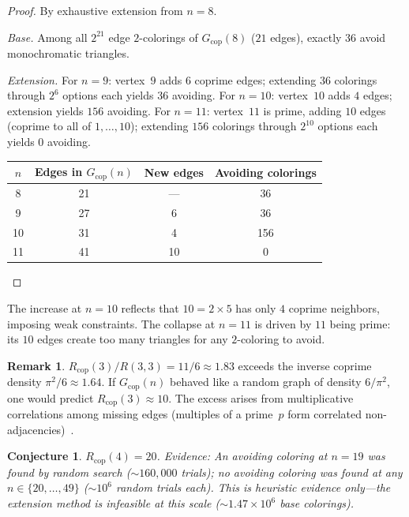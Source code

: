 \documentclass[11pt]{article}
\theoremstyle{plain}
\newtheorem{conjecture}[theorem]{Conjecture}
\theoremstyle{definition}
\newtheorem{remark}[theorem]{Remark}
\newcommand{\Rcop}{R_{\mathrm{cop}}}
\newcommand{\Gcop}{G_{\mathrm{cop}}}
\begin{document}
\begin{proof}
By exhaustive extension from $n=8$.

\emph{Base.} Among all $2^{21}$ edge $2$-colorings of $\Gcop(8)$
($21$ edges), exactly $36$ avoid monochromatic triangles.

\emph{Extension.} For $n=9$: vertex~$9$ adds $6$ coprime edges;
extending $36$ colorings through $2^6$ options each yields $36$
avoiding. For $n=10$: vertex~$10$ adds $4$ edges; extension yields
$156$ avoiding. For $n=11$: vertex~$11$ is prime, adding $10$ edges
(coprime to all of $1,\ldots,10$); extending $156$ colorings through
$2^{10}$ options each yields $0$ avoiding.

\begin{center}
\begin{tabular}{@{}cccc@{}}
\toprule
$n$ & Edges in $\Gcop(n)$ & New edges & Avoiding colorings \\
\midrule
8  & 21 & ---  & 36  \\
9  & 27 & 6  & 36  \\
10 & 31 & 4  & 156 \\
11 & 41 & 10 & 0   \\
\bottomrule
\end{tabular}
\end{center}
\end{proof}

The increase at $n=10$ reflects that $10=2\times 5$ has only $4$
coprime neighbors, imposing weak constraints. The collapse at $n=11$
is driven by $11$ being prime: its $10$ edges create too many
triangles for any $2$-coloring to avoid.

\begin{remark}\label{rem:rcop-ratio}
$\Rcop(3)/R(3,3)=11/6\approx 1.83$ exceeds the inverse coprime
density $\pi^2/6\approx 1.64$. If $\Gcop(n)$ behaved like a random
graph of density $6/\pi^2$, one would predict $\Rcop(3)\approx 10$.
The excess arises from multiplicative correlations among missing
edges (multiples of a prime~$p$ form correlated
non-adjacencies)~\cite{erdos1997coprime}.
\end{remark}

\begin{conjecture}\label{conj:rcop4}
$\Rcop(4)=20$. \emph{Evidence:} An avoiding coloring at $n=19$ was
found by random search ($\sim\!160{,}000$ trials); no avoiding
coloring was found at any $n\in\{20,\ldots,49\}$ ($\sim\!10^6$
random trials each). This is heuristic evidence only---the extension
method is infeasible at this scale ($\sim\!1.47\times 10^6$ base
colorings).
\end{conjecture}
\end{document}
